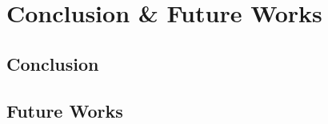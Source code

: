 \chapter{Conclusion \& Future Works}
\label{ch:conclusion}


\section{Conclusion}
\label{sec:concl-summary}

\section{Future Works}
\label{sec:concl-future}
